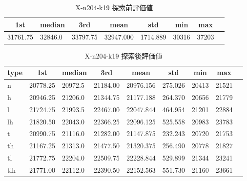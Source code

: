 \begin{table}[htbp]
    \centering
    \caption{X-n204-k19 探索前評価値}
    \begin{tabular}{|l|l|l|l|l|l|l|l|}\hline
    \multicolumn{1}{|c|}{\textbf{1st}}
    &\multicolumn{1}{c|}{\textbf{median}}
    &\multicolumn{1}{c|}{\textbf{3rd}}
    &\multicolumn{1}{c|}{\textbf{mean}}
    &\multicolumn{1}{c|}{\textbf{std}}
    &\multicolumn{1}{c|}{\textbf{min}}
    &\multicolumn{1}{c|}{\textbf{max}}\\\hline
	31761.75 & 32846.0 & 33797.75 & 32947.000 & 1714.889 & 30316 & 37203\\\hline
	\end{tabular}
\end{table}
\begin{table}[htbp]
    \centering
    \caption{X-n204-k19 探索後評価値}
    \begin{tabular}{|l|l|l|l|l|l|l|l|l|}\hline
    \multicolumn{1}{|c|}{\textbf{type}}
    &\multicolumn{1}{|c|}{\textbf{1st}}
    &\multicolumn{1}{c|}{\textbf{median}}
    &\multicolumn{1}{c|}{\textbf{3rd}}
    &\multicolumn{1}{c|}{\textbf{mean}}
    &\multicolumn{1}{c|}{\textbf{std}}
    &\multicolumn{1}{c|}{\textbf{min}}
    &\multicolumn{1}{c|}{\textbf{max}}\\\hline
	n & 20778.25 & 20972.5 & 21184.00 & 20976.156 & 275.026 & 20413 & 21521\\\hline
	h & 20946.25 & 21206.0 & 21344.75 & 21177.188 & 264.370 & 20656 & 21779\\\hline
	l & 21724.75 & 21993.5 & 22467.00 & 22047.844 & 464.954 & 21201 & 22884\\\hline
	lh & 21820.50 & 22043.0 & 22366.25 & 22096.125 & 525.558 & 20983 & 23783\\\hline
	t & 20990.75 & 21116.0 & 21282.00 & 21147.875 & 232.243 & 20720 & 21753\\\hline
	th & 21167.25 & 21313.0 & 21477.50 & 21320.375 & 256.490 & 20778 & 21827\\\hline
	tl & 21772.75 & 22204.0 & 22509.75 & 22228.844 & 529.899 & 21344 & 23241\\\hline
	tlh & 21771.00 & 22112.0 & 22390.50 & 22152.563 & 551.730 & 21160 & 23661\\\hline
	\end{tabular}
\end{table}

